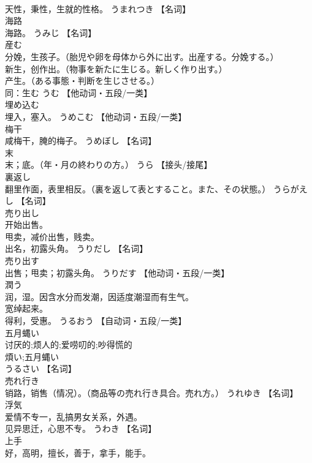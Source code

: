 \documentclass[8pt]{extreport}
\begin{document}
\begin{CJK}{UTF8}{min}
\\	天性，秉性，生就的性格。	うまれつき		【名词】
\\	海路	
\\	海路。	うみじ		【名词】
\\	産む	
\\	分娩，生孩子。（胎児や卵を母体から外に出す。出産する。分娩する。） 
\\	新生，创作出。（物事を新たに生じる。新しく作り出す。） 
\\	产生。（ある事態・判断を生じさせる。） 
\\	同：生む	うむ		【他动词・五段/一类】
\\	埋め込む	
\\	埋入，塞入。	うめこむ		【他动词・五段/一类】
\\	梅干	
\\	咸梅干，腌的梅子。	うめぼし		【名词】
\\	末	
\\	末；底。（年・月の終わりの方。）	うら		【接头/接尾】
\\	裏返し	
\\	翻里作面，表里相反。（裏を返して表とすること。また、その状態。）	うらがえし		【名词】
\\	売り出し	
\\	开始出售。 
\\	甩卖，减价出售，贱卖。 
\\	出名，初露头角。	うりだし		【名词】
\\	売り出す	
\\	出售；甩卖；初露头角。	うりだす		【他动词・五段/一类】
\\	潤う	
\\	润，湿。因含水分而发潮，因适度潮湿而有生气。 
\\	宽绰起来。 
\\	得利，受惠。	うるおう		【自动词・五段/一类】
\\	五月蝿い	
\\	讨厌的;烦人的;爱唠叨的;吵得慌的 
\\	煩い;五月蝿い 
\\	うるさい		【名词】
\\	売れ行き	
\\	销路，销售（情况）。（商品等の売れ行き具合。売れ方。）	うれゆき		【名词】
\\	浮気	
\\	爱情不专一，乱搞男女关系，外遇。 
\\	见异思迁，心思不专。	うわき		【名词】
\\	上手	
\\	好，高明，擅长，善于，拿手，能手。 

\end{CJK}
\end{document}
